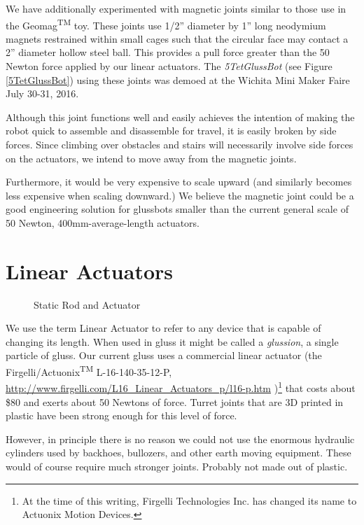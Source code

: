 \documentclass[11pt]{article}
\begin{document}
We have additionally experimented with magnetic joints similar to those use in the Geomag\textsuperscript{TM} toy.
These joints use 1/2'' diameter by 1'' long neodymium magnets restrained within small cages such that the circular face
may contact a 2'' diameter hollow steel ball.  This provides a pull force greater than the 50 Newton force applied by our linear
actuators. The \emph{5TetGlussBot} (see Figure \ref{5TetGlussBot}) using these
joints was demoed at the Wichita Mini Maker Faire July 30-31, 2016.

Although this joint functions well and easily achieves the intention of making the robot quick to assemble and
disassemble for travel,
it is easily broken by side forces.
Since climbing over obstacles and stairs will necessarily involve side forces on the actuators,
we intend to move away from the magnetic joints.

Furthermore, it would be very expensive to scale upward (and similarly becomes less expensive when
scaling downward.) We believe the magnetic joint could be a good engineering solution for glussbots smaller than the current
general scale of 50 Newton, 400mm-average-length actuators.


\section{Linear Actuators}
\label{linearactuators}

\begin{figure}[!ht]
  \centering
    \caption[Static Rod and Actuator]{Static Rod and Actuator}
      \label{rodAndActuator}
\end{figure}

We use the term Linear Actuator to refer to any device that is capable of changing its length. When
used in gluss it might be called a \emph{glussion}, a single particle of gluss. Our current gluss
uses a commercial linear actuator (the Firgelli/Actuonix\textsuperscript{TM} L-16-140-35-12-P,
\href{http://www.firgelli.com/L16_Linear_Actuators_p/l16-p.htm}{http://www.firgelli.com/L16\_Linear\_Actuators\_p/l16-p.htm}
)\footnote{At the time of this writing, Firgelli Technologies Inc. has changed its name to Actuonix Motion Devices.}
that costs about \$80 and exerts about 50 Newtons of force.
Turret joints that are 3D printed in plastic have been strong enough for this level of force.

However, in principle there is no reason we could not use the enormous hydraulic cylinders
used by backhoes, bullozers, and other earth moving equipment. These would of course require much
stronger joints. Probably not made out of plastic.
\end{document}
